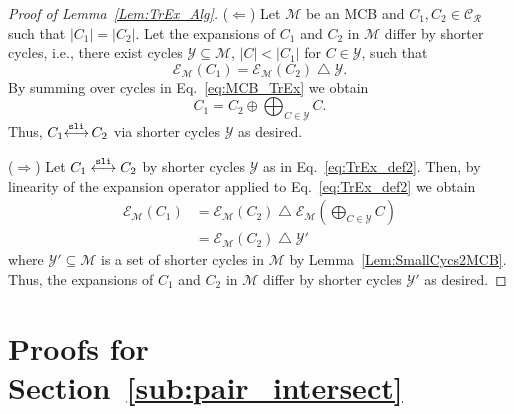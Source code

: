 \documentclass[fleqn,11pt]{article}
\newcommand\calM{\mathcal{M}}
\newcommand\calY{\mathcal{Y}}
\newcommand\RelCyc{\mathcal{C_R}} %
\newcommand\expand[2]{\mathcal{E}_{#1}\left(#2\right)}   %
\newcommand\symdiff{\mathop{\triangle}}
\newcommand\slInt{ \stackrel{\tt sli}{\longleftrightarrow} }
\begin{document}
\begin{proof}[Proof of Lemma~\ref{Lem:TrEx_Alg}]
	($\Leftarrow$) Let $\calM$ be an MCB and $C_1,C_2\in\RelCyc$ such that $|C_1|=|C_2|$. Let the expansions of $C_1$ and $C_2$ in $\calM$ differ by shorter cycles, i.e., there exist cycles $\calY\subseteq\calM$, $|C|<|C_1|$ for $C\in\calY$, such that
	\begin{equation}
		\expand{\calM}{C_1}=\expand{\calM}{C_2}\symdiff\calY.
		\label{eq:MCB_TrEx}
	\end{equation}
	By summing over cycles in Eq.~\eqref{eq:MCB_TrEx} we obtain
	\begin{equation*}
		C_1 = C_2\oplus\bigoplus_{C\in\calY} C.
	\end{equation*}
	Thus, $C_1{\slInt}\,C_2$ via shorter cycles $\calY$ as desired.
	
	($\Rightarrow$) Let $C_1\slInt C_2$ by shorter cycles $\calY$ as in Eq.~\eqref{eq:TrEx_def2}.
	Then, by linearity of the expansion operator applied to Eq.~\eqref{eq:TrEx_def2} we obtain
	\begin{equation}
		\begin{split}
			\expand{\calM}{C_1} &= \expand{\calM}{C_2} \symdiff \expand{\calM}{\bigoplus_{C\in\calY} C}\\
			&= \expand{\calM}{C_2} \symdiff \calY'
		\end{split}
	\end{equation}
	where $\calY'\subseteq\calM$ is a set of shorter cycles in $\calM$ by Lemma~\ref{Lem:SmallCycs2MCB}. Thus, the expansions of $C_1$ and $C_2$ in $\calM$ differ by shorter cycles $\calY'$ as desired.	
\end{proof}



\section{Proofs for Section~\ref{sub:pair_intersect}}
\label{app:intersect_proofs}
\end{document}
